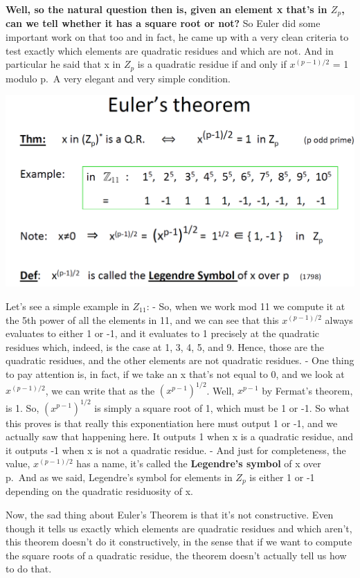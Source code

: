 \documentclass[11pt]{article}
\makeatletter
\def\maxwidth{\ifdim\Gin@nat@width>\linewidth\linewidth
    \else\Gin@nat@width\fi}
\let\Oldincludegraphics\includegraphics
\renewcommand{\includegraphics}[1]{\Oldincludegraphics[width=.8\maxwidth]{#1}}
\makeatother
\begin{document}
\textbf{Well, so the natural question then is, given an element x that's
in \(Z_{p}\), can we tell whether it has a square root or not?} So Euler
did some important work on that too and in fact, he came up with a very
clean criteria to test exactly which elements are quadratic residues and
which are not. And in particular he said that x in \(Z_{p}\) is a
quadratic residue if and only if \(x^{(p-1)/2}\) = 1 modulo p.~A very
elegant and very simple condition.

\includegraphics{./Images/NT-SqRootEulerThm.png}

Let's see a simple example in \(Z_{11}\): - So, when we work mod 11 we
compute it at the 5th power of all the elements in 11, and we can see
that this \(x^{(p-1)/2}\) always evaluates to either 1 or -1, and it
evaluates to 1 precisely at the quadratic residues which, indeed, is the
case at 1, 3, 4, 5, and 9. Hence, those are the quadratic residues, and
the other elements are not quadratic residues. - One thing to pay
attention is, in fact, if we take an x that's not equal to 0, and we
look at \(x^{(p-1)/2}\), we can write that as the \((x^{p-1})^{1/2}\).
Well, \(x^{p-1}\) by Fermat's theorem, is 1. So, \((x^{p-1})^{1/2}\) is
simply a square root of 1, which must be 1 or -1. So what this proves is
that really this exponentiation here must output 1 or -1, and we
actually saw that happening here. It outputs 1 when x is a quadratic
residue, and it outputs -1 when x is not a quadratic residue. - And just
for completeness, the value, \(x^{(p-1)/2}\) has a name, it's called the
\textbf{Legendre's symbol} of x over p.~And as we said, Legendre's
symbol for elements in \(Z_{p}\) is either 1 or -1 depending on the
quadratic residuosity of x.

Now, the sad thing about Euler's Theorem is that it's not constructive.
Even though it tells us exactly which elements are quadratic residues
and which aren't, this theorem doesn't do it constructively, in the
sense that if we want to compute the square roots of a quadratic
residue, the theorem doesn't actually tell us how to do that.
\end{document}

